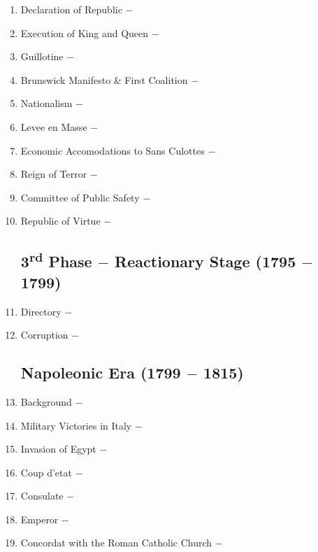 \documentclass[12pt]{article}
\begin{document}
\begin{enumerate}
\item Declaration of Republic $-$ 

\item Execution of King and Queen $-$ 

\item Guillotine $-$ 

\item Brunswick Manifesto \& First Coalition $-$ 

\item Nationalism $-$ 

\item Levee en Masse $-$ 

\item Economic Accomodations to Sans Culottes $-$

\item Reign of Terror $-$ 

\item Committee of Public Safety $-$ 

\item Republic of Virtue $-$ 

\subsection{3\textsuperscript{rd} Phase $-$ Reactionary Stage (1795 $-$ 1799)}

\item Directory $-$ 

\item Corruption $-$ 

\subsection{Napoleonic Era (1799 $-$ 1815)}

\item Background $-$ 

\item Military Victories in Italy $-$ 

\item Invasion of Egypt $-$ 

\item Coup d'etat $-$ 

\item Consulate $-$ 

\item Emperor $-$ 

\item Concordat with the Roman Catholic Church $-$ 


\end{enumerate}
\end{document}
